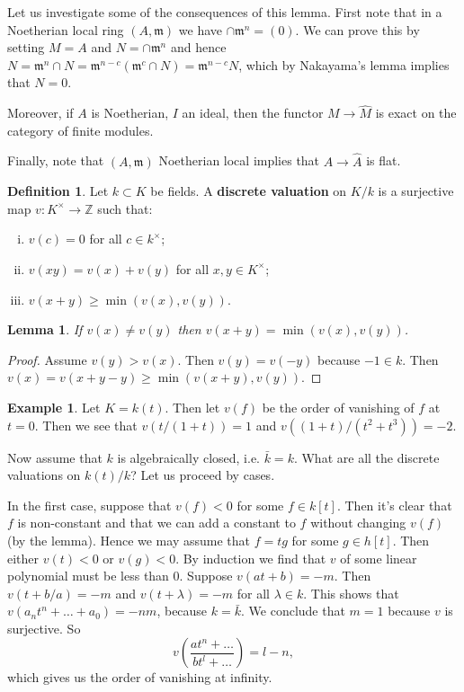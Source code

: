 \documentclass{article}
\newcommand{\Z}{\mathbb{Z}}
\newcommand{\fr}{\mathfrak}
\theoremstyle{plain}
\newtheorem*{lem*}{Lemma}
\theoremstyle{definition}
\newtheorem{defn}{Definition}
\newtheorem{exmp}{Example}
\theoremstyle{remark}
\begin{document}
Let us investigate some of the consequences of this lemma. First note that in a Noetherian local ring $(A,\fr m)$ we have $\cap\fr m^n=(0)$. We can prove this by setting $M=A$ and $N=\cap\fr m^n$ and hence $N=\fr m^n\cap N=\fr m^{n-c}(\fr m^c\cap N)=\fr m^{n-c}N$, which by Nakayama's lemma implies that $N=0$.

Moreover, if $A$ is Noetherian, $I$ an ideal, then the functor $M\to\hat M$ is exact on the category of finite modules.

Finally, note that $(A,\fr m)$ Noetherian local implies that $A\to\hat A$ is flat.

\begin{defn}
Let $k\subset K$ be fields. A \textbf{discrete valuation} on $K/k$ is a surjective map $v:K^\times\to\Z$ such that:
\begin{enumerate}[(i)]
\item $v(c)=0$ for all $c\in k^\times$;
\item $v(xy)=v(x)+v(y)$ for all $x,y\in K^\times$;
\item $v(x+y)\geq \min(v(x),v(y))$.
\end{enumerate}
\end{defn}

\begin{lem*}
If $v(x)\neq v(y)$ then $v(x+y)=\min(v(x),v(y))$.
\end{lem*}
\begin{proof}
Assume $v(y)>v(x)$. Then $v(y)=v(-y)$ because $-1\in k$. Then $v(x)=v(x+y-y)\geq\min(v(x+y),v(y))$.
\end{proof}

\begin{exmp}
Let $K=k(t)$. Then let $v(f)$ be the order of vanishing of $f$ at $t=0$. Then we see that
$v(t/(1+t))=1$ and $v((1+t)/(t^2+t^3))=-2$.
\end{exmp}

Now assume that $k$ is algebraically closed, i.e. $\bar k=k$. What are all the discrete valuations on $k(t)/k$? Let us proceed by cases.

In the first case, suppose that $v(f)<0$ for some $f\in k[t]$. Then it's clear that $f$ is non-constant and that we can add a constant to $f$ without changing $v(f)$ (by the lemma). Hence we may assume that $f=tg$ for some $g\in h[t]$. Then either $v(t)<0$ or $v(g)<0$. By induction we find that $v$ of some linear polynomial must be less than 0. Suppose $v(at+b)=-m$. Then $v(t+b/a)=-m$ and $v(t+\lambda)=-m$ for all $\lambda\in k$. This shows that $v(a_nt^n+\ldots+a_0)=-nm$, because $k=\bar k$. We conclude that $m=1$ because $v$ is surjective. So
\[v\left(\frac{at^n+\ldots}{bt^l+\ldots}\right)=l-n,\]
which gives us the order of vanishing at infinity.
\end{document}
